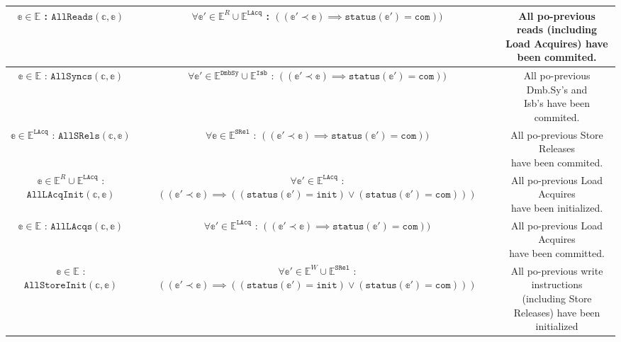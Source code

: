 \documentclass{article}
\begin{document}
\begin{center}
\begin{tabular}{||c | c | c||}
 \hline
 \makecell{$\mathbb{e} \in \mathbb{E}$ :\\$\texttt{AllReads}(\mathbb{c},\mathbb{e})$} & \makecell{$\forall \mathbb{e}' \in \mathbb{E}^R \cup \mathbb{E}^\texttt{LAcq}$ :\\$((\mathbb{e'} \prec \mathbb{e}) \implies \texttt{status}(\mathbb{e}') = \texttt{com}))$} & \makecell{All po-previous reads (including\\Load Acquires) have been commited.} \\
 \hline
 \makecell{$\mathbb{e} \in \mathbb{E}$ :\\$\texttt{AllSyncs}(\mathbb{c},\mathbb{e})$} & \makecell{$\forall \mathbb{e}' \in \mathbb{E}^\texttt{DmbSy} \cup \mathbb{E}^\texttt{Isb}$ :\\$((\mathbb{e'} \prec \mathbb{e}) \implies \texttt{status}(\mathbb{e}') = \texttt{com}))$}  & \makecell{All po-previous Dmb.Sy's and\\ Isb's have been commited.} \\
 \hline
 \makecell{$\mathbb{e} \in \mathbb{E}^\texttt{LAcq}$ :\\$\texttt{AllSRels}(\mathbb{c},\mathbb{e})$} & \makecell{$\forall \mathbb{e} \in \mathbb{E}^\texttt{SRel}$ :\\$((\mathbb{e'} \prec \mathbb{e}) \implies \texttt{status}(\mathbb{e}') = \texttt{com}))$} & \makecell{All po-previous Store Releases\\ have been commited.}\\
 \hline
 \makecell{$\mathbb{e} \in \mathbb{E}^R \cup \mathbb{E}^\texttt{LAcq}$ :\\$\texttt{AllLAcqInit}(\mathbb{c},\mathbb{e})$} & \makecell{$\forall \mathbb{e}' \in \mathbb{E}^\texttt{LAcq}$ :\\$((\mathbb{e'} \prec \mathbb{e}) \implies ((\texttt{status}(\mathbb{e'}) = \texttt{init}) \vee (\texttt{status}(\mathbb{e'}) = \texttt{com})))$} & \makecell{All po-previous Load Acquires\\ have been initialized.}\\
 \hline
 \makecell{$\mathbb{e} \in \mathbb{E}$ :\\$\texttt{AllLAcqs}(\mathbb{c},\mathbb{e})$} & \makecell{$\forall\mathbb{e}' \in \mathbb{E}^\texttt{LAcq}$ :\\$((\mathbb{e'} \prec \mathbb{e}) \implies \texttt{status}(\mathbb{e}') = \texttt{com}))$} & \makecell{All po-previous Load Acquires \\have been committed.}\\
 \hline
 \makecell{$\mathbb{e} \in \mathbb{E}$ :\\$\texttt{AllStoreInit}(\mathbb{c},\mathbb{e})$} & \makecell{$\forall \mathbb{e}' \in \mathbb{E}^W \cup \mathbb{E}^\texttt{SRel}$ :\\$((\mathbb{e'} \prec \mathbb{e}) \implies ((\texttt{status}(\mathbb{e'}) = \texttt{init}) \vee (\texttt{status}(\mathbb{e'}) = \texttt{com})))$} & \makecell{All po-previous write instructions\\ (including Store Releases) have been\\ initialized}\\

\end{tabular}
\end{center}
\end{document}

